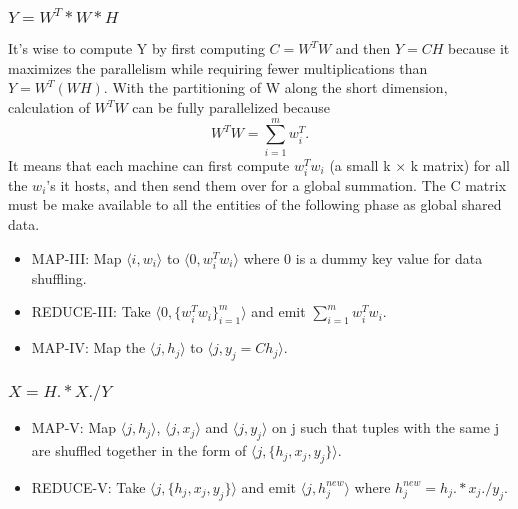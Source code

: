 \documentclass[a4paper,12pt]{article}
\begin{document}
     \subsubsection{$ Y = W^T * W * H $}
       It's wise to compute Y by first computing $C= W^T W$ and then
       $Y=CH$ because it maximizes the parallelism while requiring
       fewer multiplications than $Y= W^T (W H)$. With the partitioning
       of W along the short dimension, calculation of $ W^T W $ can be
       fully parallelized because $$ W^T W = \sum_{i=1}^{m} w_i^T. $$
       It means that each machine can first compute $w_i^T w_i$  (a
       small k × k matrix) for all the $w_i$’s it hosts, and then send
       them over for a global summation. The C matrix must be make
       available to all the entities of the following phase as global
       shared data.

       \begin{itemize}

         \item MAP-III: Map $\langle i, w_i \rangle$ to  $\langle 0,
           w_i^T w_i \rangle$ where 0 is a dummy key value for data
           shuffling.

          \item REDUCE-III: Take $\langle 0,
           \{w_i^T w_i\}_{i=1}^{m} \rangle $ and emit $\sum_{i=1}^{m} w_i^T w_i$.

         \item MAP-IV: Map the $ \langle j, h_j \rangle$ to $ \langle
           j, y_j = Ch_j \rangle$.

       \end{itemize}


     \subsubsection{$ X = H .* X ./ Y $}
       \begin{itemize}

       \item MAP-V: Map $\langle j, h_j \rangle$, $\langle j, x_j
           \rangle$ and $\langle j, y_j \rangle$ on j such that tuples
           with the same j are shuffled together in the form of
           $\langle j, \{h_j, x_j, y_j\} \rangle$.

         \item REDUCE-V: Take $\langle j, \{h_j, x_j, y_j\} \rangle$
            and emit $\langle j, h_j^{new} \rangle$ where $h_j^{new} =
            h_j .* x_j ./ y_j $.

          \end{itemize}
\end{document}
